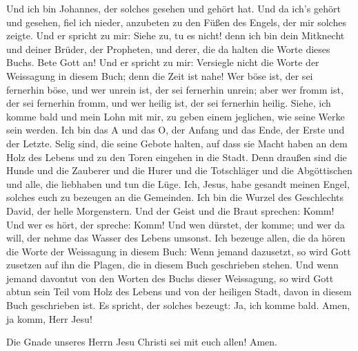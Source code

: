  Und ich bin Johannes, der solches gesehen und gehört hat.
Und da ich's gehört und gesehen, fiel ich nieder, anzubeten zu den Füßen
des Engels, der mir solches zeigte.  Und er spricht zu
mir: Siehe zu, tu es nicht! denn ich bin dein Mitknecht und deiner
Brüder, der Propheten, und derer, die da halten die Worte dieses Buchs.
Bete Gott an!  Und er spricht zu mir: Versiegle nicht die
Worte der Weissagung in diesem Buch; denn die Zeit ist nahe!
 Wer böse ist, der sei fernerhin böse, und wer unrein
ist, der sei fernerhin unrein; aber wer fromm ist, der sei fernerhin
fromm, und wer heilig ist, der sei fernerhin heilig. 
Siehe, ich komme bald und mein Lohn mit mir, zu geben einem jeglichen,
wie seine Werke sein werden.  Ich bin das A und das O,
der Anfang und das Ende, der Erste und der Letzte.  Selig
sind, die seine Gebote halten, auf dass sie Macht haben an dem Holz des
Lebens und zu den Toren eingehen in die Stadt.  Denn
draußen sind die Hunde und die Zauberer und die Hurer und die
Totschläger und die Abgöttischen und alle, die liebhaben und tun die
Lüge.  Ich, Jesus, habe gesandt meinen Engel, solches
euch zu bezeugen an die Gemeinden. Ich bin die Wurzel des Geschlechts
David, der helle Morgenstern.  Und der Geist und die
Braut sprechen: Komm! Und wer es hört, der spreche: Komm! Und wen
dürstet, der komme; und wer da will, der nehme das Wasser des Lebens
umsonst.  Ich bezeuge allen, die da hören die Worte der
Weissagung in diesem Buch: Wenn jemand dazusetzt, so wird Gott zusetzen
auf ihn die Plagen, die in diesem Buch geschrieben stehen.
 Und wenn jemand davontut von den Worten des Buchs dieser
Weissagung, so wird Gott abtun sein Teil vom Holz des Lebens und von der
heiligen Stadt, davon in diesem Buch geschrieben ist.  Es
spricht, der solches bezeugt: Ja, ich komme bald. Amen, ja komm, Herr
Jesu!

 Die Gnade unseres Herrn Jesu Christi sei mit euch allen!
Amen.
